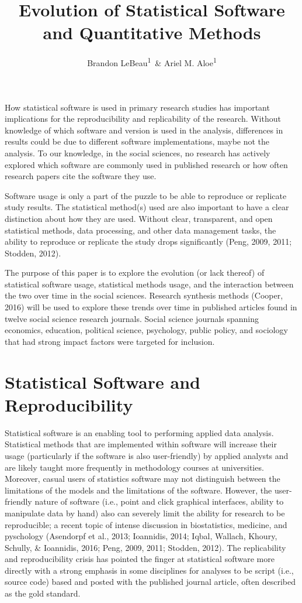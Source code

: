 \documentclass[english,,man]{apa6}
\title{Evolution of Statistical Software and Quantitative Methods}
\author{Brandon LeBeau\textsuperscript{1}~\& Ariel M. Aloe\textsuperscript{1}}
\date{}
\affiliation{
\vspace{0.5cm}
\textsuperscript{1} University of Iowa}
\begin{document}
\maketitle

How statistical software is used in primary research studies has important implications for the reproducibility and replicability of the research. Without knowledge of which software and version is used in the analysis, differences in results could be due to different software implementations, maybe not the analysis. To our knowledge, in the social sciences, no research has actively explored which software are commonly used in published research or how often research papers cite the software they use.

Software usage is only a part of the puzzle to be able to reproduce or replicate study results. The statistical method(s) used are also important to have a clear distinction about how they are used. Without clear, transparent, and open statistical methods, data processing, and other data management tasks, the ability to reproduce or replicate the study drops significantly (Peng, 2009, 2011; Stodden, 2012).

The purpose of this paper is to explore the evolution (or lack thereof) of statistical software usage, statistical methods usage, and the interaction between the two over time in the social sciences. Research synthesis methods (Cooper, 2016) will be used to explore these trends over time in published articles found in twelve social science research journals. Social science journals spanning economics, education, political science, psychology, public policy, and sociology that had strong impact factors were targeted for inclusion.

\hypertarget{statistical-software-and-reproducibility}{%
\section{Statistical Software and Reproducibility}\label{statistical-software-and-reproducibility}}

Statistical software is an enabling tool to performing applied data analysis. Statistical methods that are implemented within software will increase their usage (particularly if the software is also user-friendly) by applied analysts and are likely taught more frequently in methodology courses at universities. Moreover, casual users of statistics software may not distinguish between the limitations of the models and the limitations of the software. However, the user-friendly nature of software (i.e., point and click graphical interfaces, ability to manipulate data by hand) also can severely limit the ability for research to be reproducible; a recent topic of intense discussion in biostatistics, medicine, and pyschology (Asendorpf et al., 2013; Ioannidis, 2014; Iqbal, Wallach, Khoury, Schully, \& Ioannidis, 2016; Peng, 2009, 2011; Stodden, 2012). The replicability and reproducibility crisis has pointed the finger at statistical software more directly with a strong emphasis in some disciplines for analyses to be script (i.e., source code) based and posted with the published journal article, often described as the gold standard.
\end{document}
